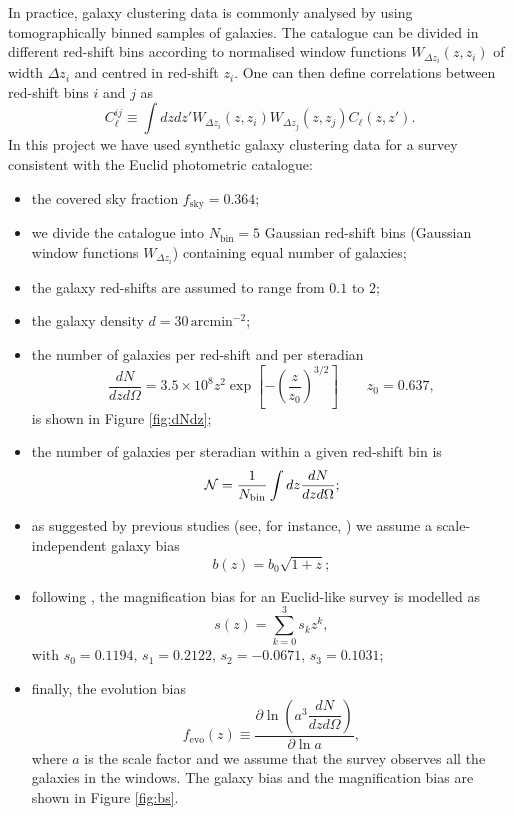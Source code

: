In practice, galaxy clustering data is commonly analysed by using tomographically binned samples of galaxies. The catalogue can be divided in different red-shift bins according to normalised window functions $W_{\Delta z_i}(z,z_i)$ of width $\Delta z_i$ and centred in red-shift $z_i$. One can then define correlations between red-shift bins $i$ and $j$ as
\begin{equation}
\label{Eq:binned-angular-matter-power-spectrum}
C_\ell^{ij} \equiv \int dz dz' W_{\Delta z_i}(z,z_i) W_{\Delta z_j}(z,z_j) C_\ell (z,z').
\end{equation} 
In this project we have used synthetic galaxy clustering data for a survey consistent with the Euclid photometric catalogue:
\begin{itemize}
\item the covered sky fraction $f_{\mathrm{sky}}=0.364$; 
\item we divide the catalogue into $N_{\mathrm{bin}}=5$ Gaussian red-shift bins (Gaussian window functions $W_{\Delta z_i}$) containing equal number of galaxies;
\item the galaxy red-shifts are assumed to range from $0.1$ to $2$;
\item the galaxy density $d=30\,\mathrm{arcmin^{-2}}$;
\item the number of galaxies per red-shift and per steradian 
\begin{equation}
\label{Eq:dNdzdOmega}
\dfrac{dN}{dzd\Omega} = 3.5\times 10^8 z^2 \exp \left[-\left( \frac{z}{z_0} \right)^{3/2} \right] \qquad z_0=0.637, 
\end{equation}
is shown in Figure \ref{fig:dNdz};
\item the number of galaxies per steradian within a given red-shift bin is 
\begin{equation}
\label{Eq:number-galaxies-per-bin}
\,{\mathcal N} = \frac{1}{N_{\mathrm{bin}}}\int dz \dfrac{dN}{dzd\Omega};
\end{equation}
\item as suggested by previous studies (see, for instance, \cite{Tegmark:2003uf}) we assume a scale-independent galaxy bias 
\begin{equation}
b(z) = b_0\sqrt{1+z};
\label{Eq:galaxy-bias}
\end{equation}
\item following \cite{Montanari:2015rga}, the magnification bias for an Euclid-like survey is modelled as 
\begin{equation}
s(z) = \sum_{k=0}^3 s_k z^k,
\label{Eq:magnification-bias}
\end{equation}
with $s_0 = 0.1194,\, s_1 = 0.2122,\, s_2 = -0.0671,\, s_3 = 0.1031$;
\item finally, the evolution bias 
\begin{equation}
f_{\mathrm{evo}}(z) \equiv \dfrac{\partial \ln \left( a^3 \dfrac{dN}{dzd\Omega}  \right)}{\partial \ln a},
\label{Eq:evolution-bias}
\end{equation}    
where $a$ is the scale factor and we assume that the survey observes all the galaxies in the windows. The galaxy bias and the magnification bias are shown in Figure \ref{fig:bs}.
\end{itemize}   

